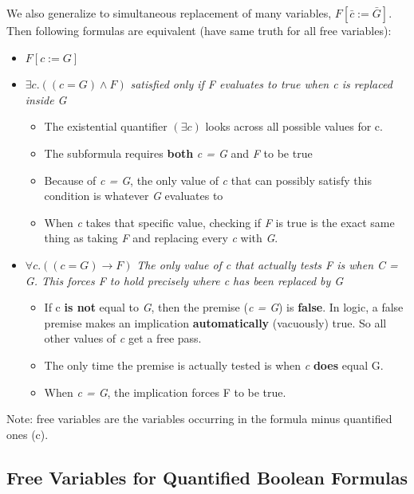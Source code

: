 \documentclass[11pt]{article}
\begin{document}
We also generalize to simultaneous replacement of many variables, $F[\bar{c} := \bar{G}].$ \\ 
Then following formulas are equivalent (have same truth for all free variables): 
\begin{itemize}
	\item $F[c := G]$
	\item $\exists c.((c = G) \land F)$ \emph{satisfied only if F evaluates to true when c is replaced inside G} 
	\begin{itemize}
		\item The existential quantifier $(\exists c)$ looks across all possible values for c. 
		\item The subformula requires \textbf{both} \textit{c = G} and \textit{F} to be true
		\item Because of \textit{c = G}, the only value of \textit{c} that can possibly satisfy this condition is whatever \textit{G} evaluates to
		\item When \textit{c} takes that specific value, checking if \textit{F} is true is the exact same thing as taking \textit{F} and replacing every \textit{c} with \textit{G}.
	\end{itemize}
	\item $\forall c. ((c = G) \to F)$ \emph{The only value of c that actually tests F is when C = G. This forces F to hold precisely where c has been replaced by G}
	\begin{itemize}
		\item If c \textbf{is not} equal to \textit{G}, then the premise (\textit{c = G}) is \textbf{false}. In logic, a false premise makes an implication \textbf{automatically} (vacuously) true. So all other values of \textit{c} get a free pass.
		\item The only time the premise is actually tested is when \textit{c} \textbf{does} equal G.
		\item When \textit{c = G}, the implication forces F to be true. 
	\end{itemize}
\end{itemize}

Note: free variables are the variables occurring in the formula minus quantified ones (c). 

\subsection*{Free Variables for Quantified Boolean Formulas}
\end{document}
